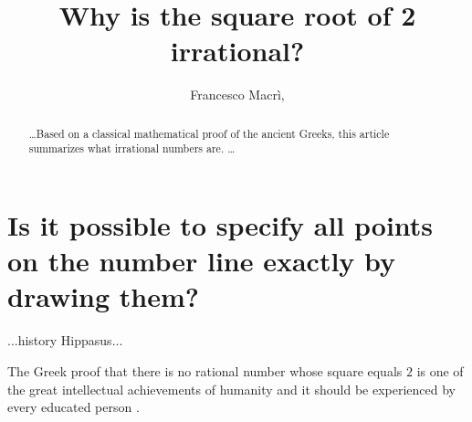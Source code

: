 \documentclass[11pt]{amsart}
\theoremstyle{definition}
\begin{document}
\title{Why is the square root of 2 irrational?}
\author{Francesco Macrì, }
\begin{abstract}
    \dots Based on a classical mathematical proof of the ancient Greeks, this article summarizes what irrational numbers are. \dots
\end{abstract}
\maketitle
\section{Is it possible to specify all points on the number line exactly by drawing them?}
...history Hippasus...

The Greek proof that there is no rational number whose square equals \(2\) is one of the great intellectual achievements of humanity and it should be experienced by every educated person \cite[4]{axler_algebra_2012}.
\end{document}
